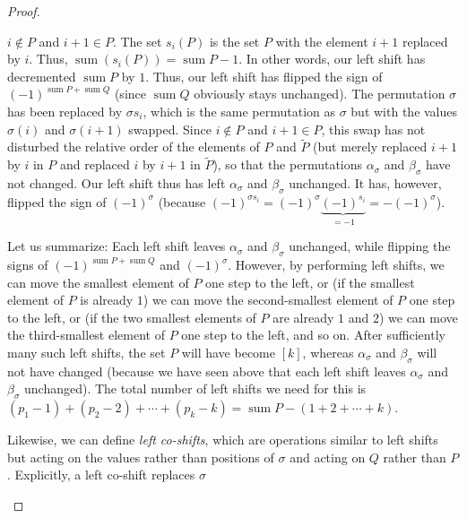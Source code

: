 \begin{proof}
\begin{fineprint}
{$i\notin P$ and $i+1\in P$. The set $s_{i}\left(  P\right)  $ is the set $P$
with the element $i+1$ replaced by $i$. Thus, $\operatorname*{sum}\left(
s_{i}\left(  P\right)  \right)  =\operatorname*{sum}P-1$. In other words, our
left shift has decremented $\operatorname*{sum}P$ by $1$. Thus, our left shift
has flipped the sign of $\left(  -1\right)  ^{\operatorname*{sum}%
P+\operatorname*{sum}Q}$ (since $\operatorname*{sum}Q$ obviously stays
unchanged). The permutation $\sigma$ has been replaced by $\sigma s_{i}$,
which is the same permutation as $\sigma$ but with the values $\sigma\left(
i\right)  $ and $\sigma\left(  i+1\right)  $ swapped. Since $i\notin P$ and
$i+1\in P$, this swap has not disturbed the relative order of the elements of
$P$ and $\widetilde{P}$ (but merely replaced $i+1$ by $i$ in $P$ and replaced
$i$ by $i+1$ in $\widetilde{P}$), so that the permutations $\alpha_{\sigma}$
and $\beta_{\sigma}$ have not changed. Our left shift thus has left
$\alpha_{\sigma}$ and $\beta_{\sigma}$ unchanged. It has, however, flipped the
sign of $\left(  -1\right)  ^{\sigma}$ (because $\left(  -1\right)  ^{\sigma
s_{i}}=\left(  -1\right)  ^{\sigma}\underbrace{\left(  -1\right)  ^{s_{i}}%
}_{=-1}=-\left(  -1\right)  ^{\sigma}$).
\par
Let us summarize: Each left shift leaves $\alpha_{\sigma}$ and $\beta_{\sigma
}$ unchanged, while flipping the signs of $\left(  -1\right)
^{\operatorname*{sum}P+\operatorname*{sum}Q}$ and $\left(  -1\right)
^{\sigma}$. However, by performing left shifts, we can move the smallest
element of $P$ one step to the left, or (if the smallest element of $P$ is
already $1$) we can move the second-smallest element of $P$ one step to the
left, or (if the two smallest elements of $P$ are already $1$ and $2$) we can
move the third-smallest element of $P$ one step to the left, and so on. After
sufficiently many such left shifts, the set $P$ will have become $\left[
k\right]  $, whereas $\alpha_{\sigma}$ and $\beta_{\sigma}$ will not have
changed (because we have seen above that each left shift leaves $\alpha
_{\sigma}$ and $\beta_{\sigma}$ unchanged). The total number of left shifts we
need for this is $\left(  p_{1}-1\right)  +\left(  p_{2}-2\right)
+\cdots+\left(  p_{k}-k\right)  =\operatorname*{sum}P-\left(  1+2+\cdots
+k\right)  $.
\par
Likewise, we can define \emph{left co-shifts}, which are operations similar to
left shifts but acting on the values rather than positions of $\sigma$ and
acting on $Q$ rather than $P$. Explicitly, a left co-shift replaces $\sigma$
}
\end{fineprint}
\end{proof}
